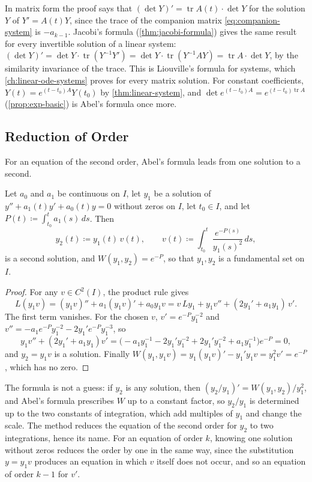 In matrix form the proof says that $(\det Y)'=\operatorname{tr}A(t)\cdot\det Y$ for the solution $Y$ of $Y'=A(t)Y$, since the trace of the companion matrix \eqref{eq:companion-system} is $-a_{k-1}$. Jacobi's formula (\cref{thm:jacobi-formula}) gives the same result for every invertible solution of a linear system: $(\det Y)'=\det Y\cdot\operatorname{tr}(Y^{-1}Y')=\det Y\cdot\operatorname{tr}(Y^{-1}AY)=\operatorname{tr}A\cdot\det Y$, by the similarity invariance of the trace. This is Liouville's formula for systems, which \cref{ch:linear-ode-systems} proves for every matrix solution. For constant coefficients, $Y(t)=e^{(t-t_0)A}Y(t_0)$ by \cref{thm:linear-system}, and $\det e^{(t-t_0)A}=e^{(t-t_0)\operatorname{tr}A}$ (\cref{prop:exp-basic}) is Abel's formula once more.

\subsection{Reduction of Order}

For an equation of the second order, Abel's formula leads from one solution to a second.

\begin{proposition}
\label{prop:reduction-order}
Let $a_0$ and $a_1$ be continuous on $I$, let $y_1$ be a solution of $y''+a_1(t)y'+a_0(t)y=0$ without zeros on $I$, let $t_0\in I$, and let $P(t)\coloneqq\int_{t_0}^ta_1(s)\,ds$. Then
\[
y_2(t)\coloneqq y_1(t)\,v(t),\qquad v(t)\coloneqq\int_{t_0}^t\frac{e^{-P(s)}}{y_1(s)^2}\,ds ,
\]
is a second solution, and $W(y_1,y_2)=e^{-P}$, so that $y_1,y_2$ is a fundamental set on $I$.
\end{proposition}

\begin{proof}
For any $v\in C^2(I)$, the product rule gives
\[
L(y_1v)=(y_1v)''+a_1(y_1v)'+a_0y_1v=v\,Ly_1+y_1v''+(2y_1'+a_1y_1)\,v' .
\]
The first term vanishes. For the chosen $v$, $v'=e^{-P}y_1^{-2}$ and $v''=-a_1e^{-P}y_1^{-2}-2y_1'e^{-P}y_1^{-3}$, so
\[
y_1v''+(2y_1'+a_1y_1)v'=\bigl(-a_1y_1^{-1}-2y_1'y_1^{-2}+2y_1'y_1^{-2}+a_1y_1^{-1}\bigr)e^{-P}=0 ,
\]
and $y_2=y_1v$ is a solution. Finally $W(y_1,y_1v)=y_1(y_1v)'-y_1'y_1v=y_1^2v'=e^{-P}$, which has no zero.
\end{proof}

The formula is not a guess: if $y_2$ is any solution, then $(y_2/y_1)'=W(y_1,y_2)/y_1^2$, and Abel's formula prescribes $W$ up to a constant factor, so $y_2/y_1$ is determined up to the two constants of integration, which add multiples of $y_1$ and change the scale. The method reduces the equation of the second order for $y_2$ to two integrations, hence its name. For an equation of order $k$, knowing one solution without zeros reduces the order by one in the same way, since the substitution $y=y_1v$ produces an equation in which $v$ itself does not occur, and so an equation of order $k-1$ for $v'$.

